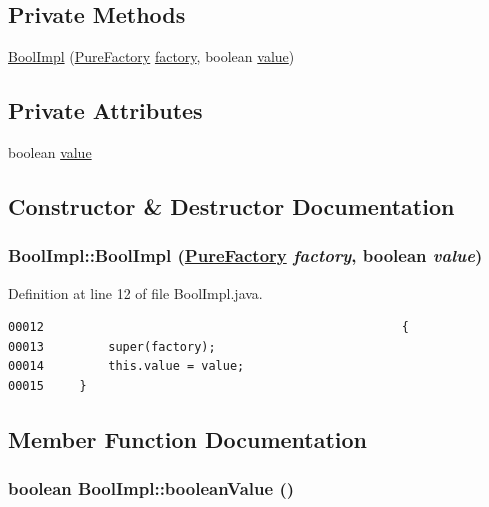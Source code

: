 \subsection*{Private Methods}
\begin{CompactItemize}
\item 
\hyperlink{classBoolImpl_c0}{Bool\-Impl} (\hyperlink{classPureFactory}{Pure\-Factory} \hyperlink{classDataImpl_o0}{factory}, boolean \hyperlink{classBoolImpl_o0}{value})
\end{CompactItemize}
\subsection*{Private Attributes}
\begin{CompactItemize}
\item 
boolean \hyperlink{classBoolImpl_o0}{value}
\end{CompactItemize}


\subsection{Constructor \& Destructor Documentation}
\hypertarget{classBoolImpl_c0}{
\subsubsection[BoolImpl]{\setlength{\rightskip}{0pt plus 5cm}Bool\-Impl::Bool\-Impl (\hyperlink{classPureFactory}{Pure\-Factory} {\em factory}, boolean {\em value})}}
\label{classBoolImpl_c0}




Definition at line 12 of file Bool\-Impl.java.\footnotesize\begin{verbatim}00012                                                  {
00013         super(factory);
00014         this.value = value;
00015     }
\end{verbatim}\normalsize 


\subsection{Member Function Documentation}
\hypertarget{classBoolImpl_a0}{
\subsubsection[booleanValue]{\setlength{\rightskip}{0pt plus 5cm}boolean Bool\-Impl::boolean\-Value ()}}
\label{classBoolImpl_a0}




